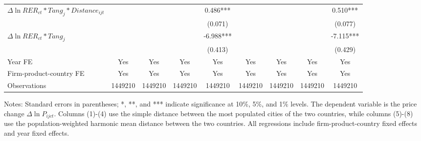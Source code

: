 \documentclass[12pt]{article}
\begin{document}
\begin{table}
{\begin{threeparttable}
\begin{tabular}{lcccccccc}
				$\Delta \ln RER_{ct}*Tang_{j}*Distance_{ijt}$ &       &       &       & 0.486***
				&       &       &       & 0.510***\\
				&       &       &       & (0.071) &       &       &       & (0.077)\\
				$\Delta \ln RER_{ct}*Tang_{j}$ &       &       &       & -6.988*** &       &       &       & -7.115***\\
				&       &       &       & (0.413) &       &       &       & (0.429)\\
				Year FE  & Yes   & Yes   & Yes   & Yes & Yes   & Yes   & Yes   & Yes\\
				Firm-product-country FE & Yes   & Yes   & Yes   & Yes & Yes   & Yes   & Yes   & Yes\\
				Observations & 1449210 & 1449210 & 1449210 & 1449210 & 1449210 & 1449210 & 1449210 & 1449210\\
				\bottomrule
			\end{tabular}
			\begin{tablenotes}
				\footnotesize
				\item[Notes:] Standard errors in parentheses; *, **, and *** indicate significance at 10\%, 5\%, and 1\% levels. The dependent variable is the price change $\Delta \ln P_{ijct}$. Columns (1)-(4) use the simple distance between the most populated cities of the two countries, while columns (5)-(8) use the population-weighted harmonic mean distance between the two countries. All regressions include firm-product-country fixed effects and year fixed effects.
			\end{tablenotes}
		\end{threeparttable}
	}
	\label{tab.source.distance}
\end{table}
\end{document}
